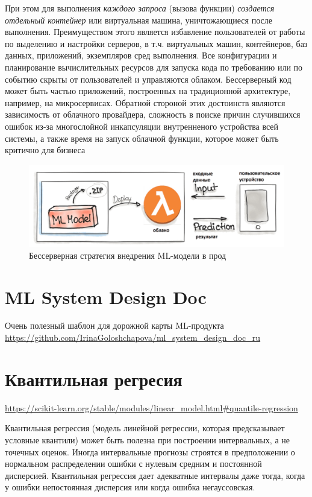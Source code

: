 \documentclass[%
	11pt,
	a4paper,
	utf8,
		]{article}
\begin{document}
При этом для выполнения \emph{каждого запроса} (вызова функции) \emph{создается отдельный контейнер} или виртуальная машина, уничтожающиеся после выполнения. Преимуществом этого является избавление пользователей от работы по выделению и настройки серверов, в т.ч. виртуальных машин, контейнеров, баз данных, приложений, экземпляров сред выполнения. Все конфигурации и планирование вычислительных ресурсов для запуска кода по требованию или по событию скрыты от пользователей и управляются облаком. Бессерверный код может быть частью приложений, построенных на традиционной архитектуре, например, на микросервисах. Обратной стороной этих достоинств являются зависимость от облачного провайдера, сложность в поиске причин случившихся ошибок из-за многослойной инкапсуляции внутренненого устройства всей системы, а также время на запуск облачной функции, которое может быть критично для бизнеса 

 \begin{figure}[h]
	\centering
	\includegraphics[scale=0.6]{figures/serverless.png}
	\caption{ Бессерверная стратегия внедрения ML-модели в прод }\label{fig:serverless}
\end{figure}






\section{ML System Design Doc}

Очень полезный шаблон для дорожной карты ML-продукта \url{https://github.com/IrinaGoloshchapova/ml_system_design_doc_ru}


\section{Квантильная регресия}

\url{https://scikit-learn.org/stable/modules/linear_model.html#quantile-regression}

Квантильная регрессия (модель линейной регрессии, которая предсказывает условные квантили) может быть полезна при построении интервальных, а не точечных оценок. Иногда интервальные прогнозы строятся в предположении о нормальном распределении ошибки с нулевым средним и постоянной дисперсией. Квантильная регрессия дает адекватные интервалы даже тогда, когда у ошибки непостоянная дисперсия или когда ошибка негауссовская. 
\end{document}
